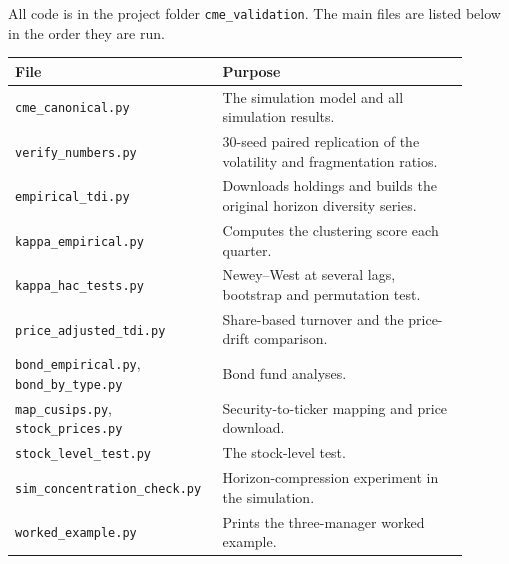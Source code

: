 All code is in the project folder \texttt{cme\_validation}. The main files are listed below in the order they are run.

\begin{center}
\small
\begin{tabular}{p{0.38\linewidth}p{0.52\linewidth}}
\toprule
File & Purpose\\
\midrule
\texttt{cme\_canonical.py} & The simulation model and all simulation results.\\
\texttt{verify\_numbers.py} & 30-seed paired replication of the volatility and fragmentation ratios.\\
\texttt{empirical\_tdi.py} & Downloads holdings and builds the original horizon diversity series.\\
\texttt{kappa\_empirical.py} & Computes the clustering score each quarter.\\
\texttt{kappa\_hac\_tests.py} & Newey--West at several lags, bootstrap and permutation test.\\
\texttt{price\_adjusted\_tdi.py} & Share-based turnover and the price-drift comparison.\\
\texttt{bond\_empirical.py}, \texttt{bond\_by\_type.py} & Bond fund analyses.\\
\texttt{map\_cusips.py}, \texttt{stock\_prices.py} & Security-to-ticker mapping and price download.\\
\texttt{stock\_level\_test.py} & The stock-level test.\\
\texttt{sim\_concentration\_check.py} & Horizon-compression experiment in the simulation.\\
\texttt{worked\_example.py} & Prints the three-manager worked example.\\
\bottomrule
\end{tabular}
\end{center}
